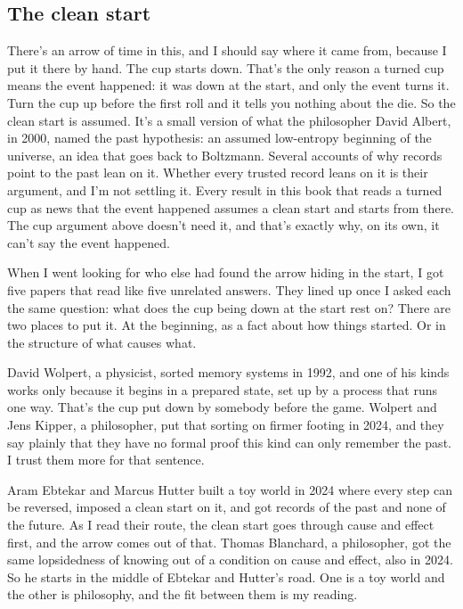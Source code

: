 \documentclass[11pt,twoside]{article}
\theoremstyle{thielethm}
\theoremstyle{thieledef}
\theoremstyle{thieledef}
\theoremstyle{thieledef}
\theoremstyle{thielethm}
\theoremstyle{thieleobs}
\theoremstyle{thielethm}
\begin{document}
\subsection{The clean start}

There's an arrow of time in this, and I should say where it came from, because I put it there by hand. The cup starts down. That's the only reason a turned cup means the event happened: it was down at the start, and only the event turns it. Turn the cup up before the first roll and it tells you nothing about the die. So the clean start is assumed. It's a small version of what the philosopher David Albert, in 2000, named the past hypothesis: an assumed low-entropy beginning of the universe, an idea that goes back to Boltzmann. Several accounts of why records point to the past lean on it. Whether every trusted record leans on it is their argument, and I'm not settling it. Every result in this book that reads a turned cup as news that the event happened assumes a clean start and starts from there. The cup argument above doesn't need it, and that's exactly why, on its own, it can't say the event happened.

When I went looking for who else had found the arrow hiding in the start, I got five papers that read like five unrelated answers. They lined up once I asked each the same question: what does the cup being down at the start rest on? There are two places to put it. At the beginning, as a fact about how things started. Or in the structure of what causes what.

David Wolpert, a physicist, sorted memory systems in 1992, and one of his kinds works only because it begins in a prepared state, set up by a process that runs one way. That's the cup put down by somebody before the game. Wolpert and Jens Kipper, a philosopher, put that sorting on firmer footing in 2024, and they say plainly that they have no formal proof this kind can only remember the past. I trust them more for that sentence.

Aram Ebtekar and Marcus Hutter built a toy world in 2024 where every step can be reversed, imposed a clean start on it, and got records of the past and none of the future. As I read their route, the clean start goes through cause and effect first, and the arrow comes out of that. Thomas Blanchard, a philosopher, got the same lopsidedness of knowing out of a condition on cause and effect, also in 2024. So he starts in the middle of Ebtekar and Hutter's road. One is a toy world and the other is philosophy, and the fit between them is my reading.
\end{document}
